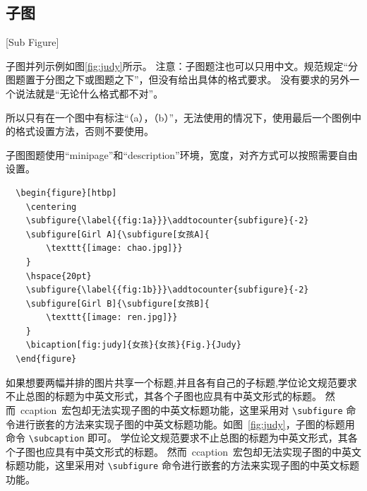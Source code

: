 \begin{figure}[htbp]
\begin{minipage}[t]{0.4\textwidth}
  \end{minipage}
\end{figure}

\subsection{子图}[Sub Figure]

子图并列示例如图\ref{fig:judy}所示。
注意：子图题注也可以只用中文。规范规定“分图题置于分图之下或图题之下”，但没有给出具体的格式要求。
没有要求的另外一个说法就是“无论什么格式都不对”。

所以只有在一个图中有标注“（a），（b）”，无法使用的情况下，使用最后一个图例中的格式设置方法，否则不要使用。

子图图题使用“minipage”和“description”环境，宽度，对齐方式可以按照需要自由设置。

\begin{figure}[htbp]
  \centering
  \addtocounter{subfigure}{-2}
  \hspace{20pt}
  \addtocounter{subfigure}{-2}
\end{figure}

\begin{lstlisting}
  \begin{figure}[htbp]
    \centering
    \subfigure{\label{{fig:1a}}}\addtocounter{subfigure}{-2}
    \subfigure[Girl A]{\subfigure[女孩A]{
        \texttt{[image: chao.jpg]}}
    }
    \hspace{20pt}
    \subfigure{\label{{fig:1b}}}\addtocounter{subfigure}{-2}
    \subfigure[Girl B]{\subfigure[女孩B]{
        \texttt{[image: ren.jpg]}}
    }
    \bicaption[fig:judy]{女孩}{女孩}{Fig.}{Judy}
  \end{figure}
\end{lstlisting}


如果想要两幅并排的图片共享一个标题,并且各有自己的子标题,学位论文规范要求不止总图的标题为中英文形式，其各个子图也应具有中英文形式的标题。
然而~ccaption~宏包却无法实现子图的中英文标题功能，这里采用对 \verb|\subfigure| 命令进行嵌套的方法来实现子图的中英文标题功能。如图~\ref{fig:judy}，子图的标题用命令 \verb|\subcaption| 即可。
学位论文规范要求不止总图的标题为中英文形式，其各个子图也应具有中英文形式的标题。
然而~ccaption~宏包却无法实现子图的中英文标题功能，这里采用对 \verb|\subfigure| 命令进行嵌套的方法来实现子图的中英文标题功能。

